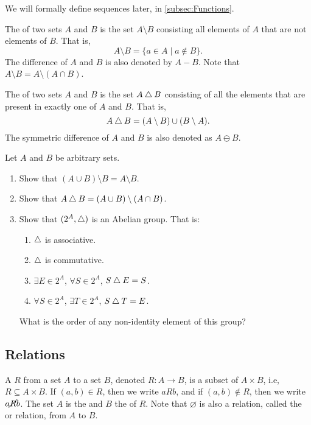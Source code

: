 \begin{Note*}
We will formally define sequences later, in \cref{subsec:Functions}.
\end{Note*}

The  of two sets $A$ and $B$ is the set $A \setminus B$ consisting all elements of $A$ that are not elements of $B$. That is,
\begin{equation*}
A \setminus B = \{ a \in A \mid a \notin B \}.
\end{equation*}
The difference of $A$ and $B$ is also denoted by $A - B$. Note that $A \setminus B = A \setminus (A \cap B)$.

The  of two sets $A$ and $B$ is the set $A \mathbin{\triangle} B$ consisting of all the elements that are present in exactly one of $A$ and $B$. That is,
\begin{equation*}
A \mathbin{\triangle} B = (A \setminus B) \cup (B \setminus A).
\end{equation*}
The symmetric difference of $A$ and $B$ is also denoted as $A \ominus B$.

\begin{Exercise}
Let $A$ and $B$ be arbitrary sets.
\begin{enumerate}
\item Show that $(A \cup B) \setminus B = A \setminus B$.
\item Show that $A \mathbin{\triangle} B = (A \cup B) \setminus (A \cap B)$.
\item Show that $(2^A, \mathbin{\triangle})$ is an Abelian group. That is:
    \begin{enumerate}[label=(\roman*)]
    \item $\mathbin{\triangle}$ is associative.
    \item $\mathbin{\triangle}$ is commutative.
    \item $\exists E \in 2^A$, $\forall S \in 2^A$, $S \mathbin{\triangle} E = S$.
    \item $\forall S \in 2^A$, $\exists T \in 2^A$, $S \mathbin{\triangle} T = E$.
    \end{enumerate}
    What is the order of any non-identity element of this group?
\end{enumerate}
\end{Exercise}

\subsection{Relations}\label{subsec:Relations}
A  $R$ from a set $A$ to a set $B$, denoted $R \colon A \to B$, is a subset of $A \times B$, i.e, $R \subseteq A \times B$. If $(a, b) \in R$, then we write $aRb$, and if $(a, b) \notin R$, then we write $a \cancel{R} b$. The set $A$ is the  and $B$ the  of $R$. Note that $\varnothing$ is also a relation, called the  or  relation, from $A$ to $B$.

